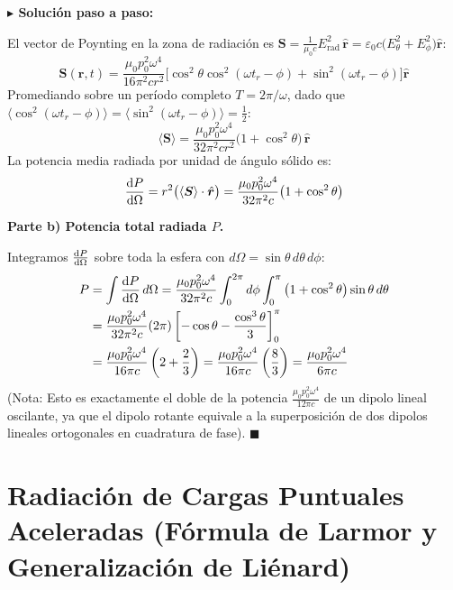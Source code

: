 \documentclass[11pt,a4paper]{book}
\newenvironment{solucion}{%
    \par\medskip\noindent\textbf{\color{blue!65!black}\Large $\blacktriangleright$ Solución paso a paso:}\par\medskip
}{%
    \hfill$\blacksquare$\par\bigskip
}
\newcommand{\rhat}{\hat{\bm{r}}}
\newcommand{\Svec}{\bm{S}}
\begin{document}
\begin{solucion}
El vector de Poynting en la zona de radiación es $\Svec = \frac{1}{\mu_0 c} E_{\text{rad}}^2 \,\rhat = \varepsilon_0 c \big(E_\theta^2 + E_\phi^2\big)\rhat$:
\begin{equation}
    \Svec(\bm{r},t) = \frac{\mu_0 p_0^2 \omega^4}{16\pi^2 c r^2} \Big[ \cos^2\theta \cos^2(\omega t_r - \phi) + \sin^2(\omega t_r - \phi) \Big] \rhat
\end{equation}
Promediando sobre un período completo $T = 2\pi/\omega$, dado que $\langle \cos^2(\omega t_r - \phi) \rangle = \langle \sin^2(\omega t_r - \phi) \rangle = \frac{1}{2}$:
\begin{equation}
    \langle \Svec \rangle = \frac{\mu_0 p_0^2 \omega^4}{32\pi^2 c r^2} \big(1 + \cos^2\theta\big)\,\rhat
\end{equation}
La potencia media radiada por unidad de ángulo sólido es:
\begin{equation}
    \dv{P}{\Omega} = r^2 \big(\langle \Svec \rangle \cdot \rhat\big) = \frac{\mu_0 p_0^2 \omega^4}{32\pi^2 c} \big(1 + \cos^2\theta\big)
\end{equation}

\medskip
\textbf{Parte b) Potencia total radiada $P$.}

Integramos $\dv{P}{\Omega}$ sobre toda la esfera con $d\Omega = \sin\theta\,d\theta\,d\phi$:
\begin{align}
    P &= \int \dv{P}{\Omega}\,d\Omega = \frac{\mu_0 p_0^2 \omega^4}{32\pi^2 c} \int_{0}^{2\pi} d\phi \int_{0}^{\pi} \big(1 + \cos^2\theta\big)\sin\theta\,d\theta \nonumber \\
    &= \frac{\mu_0 p_0^2 \omega^4}{32\pi^2 c} (2\pi) \left[ -\cos\theta - \frac{\cos^3\theta}{3} \right]_{0}^{\pi} \nonumber \\
    &= \frac{\mu_0 p_0^2 \omega^4}{16\pi c} \left( 2 + \frac{2}{3} \right) = \frac{\mu_0 p_0^2 \omega^4}{16\pi c}\left(\frac{8}{3}\right) = \frac{\mu_0 p_0^2 \omega^4}{6\pi c}
\end{align}
(Nota: Esto es exactamente el doble de la potencia $\frac{\mu_0 p_0^2 \omega^4}{12\pi c}$ de un dipolo lineal oscilante, ya que el dipolo rotante equivale a la superposición de dos dipolos lineales ortogonales en cuadratura de fase).
\end{solucion}

\section[Radiación de cargas aceleradas]{Radiación de Cargas Puntuales Aceleradas (Fórmula de Larmor y Generalización de Liénard)}
\end{document}
